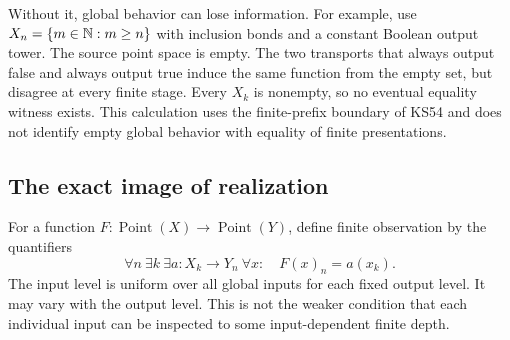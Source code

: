 Without it, global behavior can lose information. For example, use \(X_n=\{m\in\mathbb N:m\ge n\}\) with inclusion bonds and a constant Boolean output tower. The source point space is empty. The two transports that always output false and always output true induce the same function from the empty set, but disagree at every finite stage. Every \(X_k\) is nonempty, so no eventual equality witness exists. This calculation uses the finite-prefix boundary of KS54 and does not identify empty global behavior with equality of finite presentations.

\subsection{The exact image of realization}
For a function \(F:\operatorname{Point}(X)\to\operatorname{Point}(Y)\), define finite observation by the quantifiers
\begin{equation}\label{eq:finite-observation}
 \forall n\ \exists k\ \exists a:X_k\to Y_n\ \forall x:\quad
 F(x)_n=a(x_k).
\end{equation}
The input level is uniform over all global inputs for each fixed output level. It may vary with the output level. This is not the weaker condition that each individual input can be inspected to some input-dependent finite depth.

